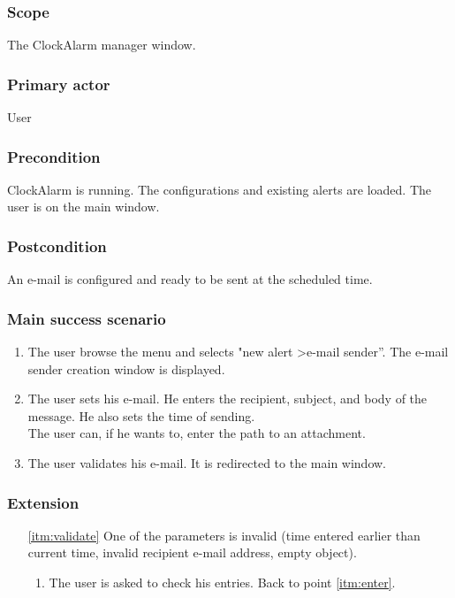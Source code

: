 \subsubsection{Scope}
The ClockAlarm manager window.
\subsubsection{Primary actor}
User
\subsubsection{Precondition}
ClockAlarm is running. The configurations and existing alerts are loaded. The user is on the main window.
\subsubsection{Postcondition}
An e-mail is configured and ready to be sent at the scheduled time.
\subsubsection{Main success scenario}
\begin{enumerate}
	\item The user browse the menu and selects "new alert \textgreater e-mail sender''. The e-mail sender creation window is displayed. 
	\item \label{itm:enter} The user sets his e-mail. He enters the recipient, subject, and body of the message. He also sets the time of sending. \\The user can, if he wants to, enter the path to an attachment.
	\item \label{itm:validate} The user validates his e-mail. It is redirected to the main window.
\end{enumerate}
\subsubsection{Extension}
\begin{enumerate}
	\item[\ref{itm:validate}] One of the parameters is invalid (time entered earlier than current time, invalid recipient e-mail address, empty object).
	\begin{enumerate}[i]
		\item The user is asked to check his entries. Back to point \ref{itm:enter}.
	\end{enumerate}
\end{enumerate}